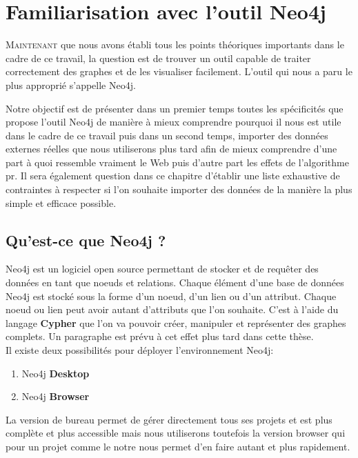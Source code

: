 \documentclass[12pt,twoside, openright]{memoir}
\begin{document}
	\chapter{Familiarisation avec l'outil Neo4j}
	\lettrine[lraise=0.1, nindent=0em]{M}{aintenant} que nous avons établi tous les points théoriques importants dans le cadre de ce travail, la question est de trouver un outil capable de traiter correctement des graphes et de les visualiser facilement. L'outil qui nous a paru le plus approprié s'appelle Neo4j.\par
	Notre objectif est de présenter dans un premier temps toutes les spécificités que propose l'outil Neo4j de manière à mieux comprendre pourquoi il nous est utile dans le cadre de ce travail puis dans un second temps, importer des données externes réelles que nous utiliserons plus tard afin de mieux comprendre d'une part à quoi ressemble vraiment le Web puis d'autre part les effets de l'algorithme \gls{pr}. Il sera également question dans ce chapitre d'établir une liste exhaustive de contraintes à respecter si l'on souhaite importer des données de la manière la plus simple et efficace possible.
	\section{Qu'est-ce que Neo4j ?}
	Neo4j est un logiciel open source permettant de stocker et de requêter des données en tant que noeuds et relations. Chaque élément d'une base de données Neo4j est stocké sous la forme d'un noeud, d'un lien ou d'un attribut. Chaque noeud ou lien peut avoir autant d'attributs que l'on souhaite. C'est à l'aide du langage \textbf{Cypher} que l'on va pouvoir créer, manipuler et représenter des graphes complets. Un paragraphe est prévu à cet effet plus tard dans cette thèse.\\
	Il existe deux possibilités pour déployer l'environnement Neo4j:
	\begin{enumerate}
		\item Neo4j \textbf{Desktop}
		\item Neo4j \textbf{Browser}
	\end{enumerate}
	La version de bureau permet de gérer directement tous ses projets et est plus complète et plus accessible mais nous utiliserons toutefois la version browser qui pour un projet comme le notre nous permet d'en faire autant et plus rapidement.
\end{document}

